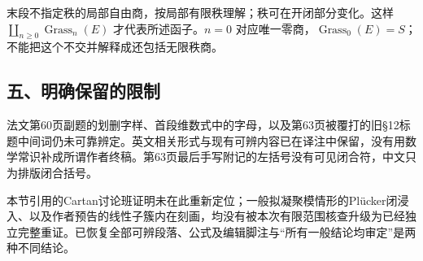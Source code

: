 末段不指定秩的局部自由商，按局部有限秩理解；秩可在开闭部分变化。这样 $\coprod_{n\geq0}\operatorname{Grass}_n(E)$ 才代表所述函子。$n=0$ 对应唯一零商，$\operatorname{Grass}_0(E)=S$；不能把这个不交并解释成还包括无限秩商。

\subsection*{五、明确保留的限制}

法文第60页副题的划删字样、首段维数式中的字母，以及第63页被覆打的旧§12标题中间词仍未可靠辨定。英文相关形式与现有可辨内容已在译注中保留，没有用数学常识补成所谓作者终稿。第63页最后手写附记的左括号没有可见闭合符，中文只为排版闭合括号。

本节引用的Cartan讨论班证明未在此重新定位；一般拟凝聚模情形的Pl\"ucker闭浸入、以及作者预告的线性子簇内在刻画，均没有被本次有限范围核查升级为已经独立完整重证。已恢复全部可辨段落、公式及编辑脚注与“所有一般结论均审定”是两种不同结论。
